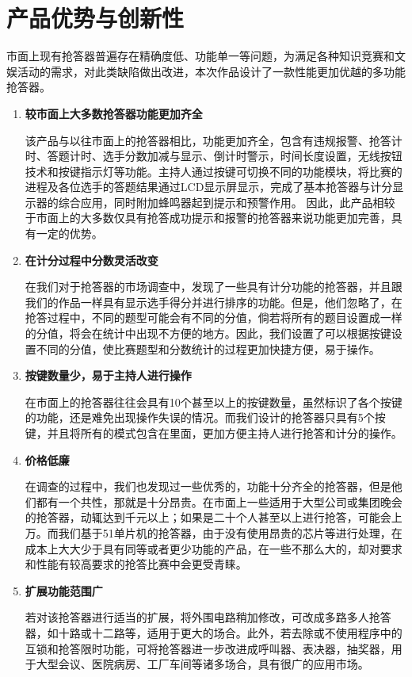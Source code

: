 \documentclass[12pt]{article}
\begin{document}
\section{产品优势与创新性}
市面上现有抢答器普遍存在精确度低、功能单一等问题，为满足各种知识竞赛和文娱活动的需求，对此类缺陷做出改进，本次作品设计了一款性能更加优越的多功能抢答器。
\begin{enumerate}
  \item \textbf{较市面上大多数抢答器功能更加齐全}

该产品与以往市面上的抢答器相比，功能更加齐全，包含有违规报警、抢答计时、答题计时、选手分数加减与显示、倒计时警示，时间长度设置，无线按钮技术和按键指示灯等功能。主持人通过按键可切换不同的功能模块，将比赛的进程及各位选手的答题结果通过LCD显示屏显示，完成了基本抢答器与计分显示器的综合应用，同时附加蜂鸣器起到提示和预警作用。
因此，此产品相较于市面上的大多数仅具有抢答成功提示和报警的抢答器来说功能更加完善，具有一定的优势。
\item \textbf{在计分过程中分数灵活改变}

在我们对于抢答器的市场调查中，发现了一些具有计分功能的抢答器，并且跟我们的作品一样具有显示选手得分并进行排序的功能。但是，他们忽略了，在抢答过程中，不同的题型可能会有不同的分值，倘若将所有的题目设置成一样的分值，将会在统计中出现不方便的地方。因此，我们设置了可以根据按键设置不同的分值，使比赛题型和分数统计的过程更加快捷方便，易于操作。
\item \textbf{按键数量少，易于主持人进行操作}

在市面上的抢答器往往会具有10个甚至以上的按键数量，虽然标识了各个按键的功能，还是难免出现操作失误的情况。而我们设计的抢答器只具有5个按键，并且将所有的模式包含在里面，更加方便主持人进行抢答和计分的操作。
\item \textbf{价格低廉}

在调查的过程中，我们也发现过一些优秀的，功能十分齐全的抢答器，但是他们都有一个共性，那就是十分昂贵。在市面上一些适用于大型公司或集团晚会的抢答器，动辄达到千元以上；如果是二十个人甚至以上进行抢答，可能会上万。而我们基于51单片机的抢答器，由于没有使用昂贵的芯片等进行处理，在成本上大大少于具有同等或者更少功能的产品，在一些不那么大的，却对要求和性能有较高要求的抢答比赛中会更受青睐。
\item \textbf{扩展功能范围广}

若对该抢答器进行适当的扩展，将外围电路稍加修改，可改成多路多人抢答器，如十路或十二路等，适用于更大的场合。此外，若去除或不使用程序中的互锁和抢答限时功能，可将抢答器进一步改进成呼叫器、表决器，抽奖器，用于大型会议、医院病房、工厂车间等诸多场合，具有很广的应用市场。
\end{enumerate}
\end{document}
